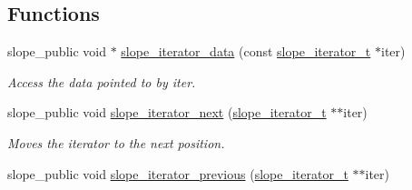 \subsection*{Functions}
\begin{DoxyCompactItemize}
\item 
slope\+\_\+public void $\ast$ \hyperlink{group__List_ga33ad9bae82e595e65a1ffe4bf7168a84}{slope\+\_\+iterator\+\_\+data} (const \hyperlink{group__List_gaad13ce078b8dfe56e5a54bafc9aff9af}{slope\+\_\+iterator\+\_\+t} $\ast$iter)
\begin{DoxyCompactList}\small\item\em Access the data pointed to by iter. \end{DoxyCompactList}\item 
\hypertarget{group__List_gae0daa8d0f64b26df51cbae035578ca55}{slope\+\_\+public void \hyperlink{group__List_gae0daa8d0f64b26df51cbae035578ca55}{slope\+\_\+iterator\+\_\+next} (\hyperlink{group__List_gaad13ce078b8dfe56e5a54bafc9aff9af}{slope\+\_\+iterator\+\_\+t} $\ast$$\ast$iter)}\label{group__List_gae0daa8d0f64b26df51cbae035578ca55}

\begin{DoxyCompactList}\small\item\em Moves the iterator to the next position. \end{DoxyCompactList}\item 
\hypertarget{group__List_ga32395735bd64e9e085a4e70ebaf96a1d}{slope\+\_\+public void \hyperlink{group__List_ga32395735bd64e9e085a4e70ebaf96a1d}{slope\+\_\+iterator\+\_\+previous} (\hyperlink{group__List_gaad13ce078b8dfe56e5a54bafc9aff9af}{slope\+\_\+iterator\+\_\+t} $\ast$$\ast$iter)}\label{group__List_ga32395735bd64e9e085a4e70ebaf96a1d}


\end{DoxyCompactItemize}
